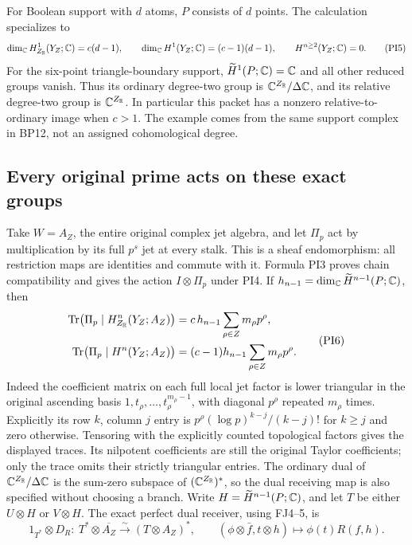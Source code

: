 For Boolean support with $d$ atoms, $P$ consists of $d$ points.
The calculation specializes to
\[
 \dim_\mathbb C H^1_{Z_\mathbb R}(Y_Z;\mathbb C)=c(d-1),\qquad
 \dim_\mathbb C H^1(Y_Z;\mathbb C)=(c-1)(d-1),
 \qquad H^{n\ge2}(Y_Z;\mathbb C)=0.
 \tag{PI5}\label{pi:boolean}
\]
For the six-point triangle-boundary support, $\widetilde H^1(P;\mathbb C)
=\mathbb C$ and all other reduced groups vanish. Thus its ordinary
degree-two group is $\mathbb C^{Z_\mathbb R}/\Delta\mathbb C$, and its relative
degree-two group is $\mathbb C^{Z_\mathbb R}$. In particular this packet
has a nonzero relative-to-ordinary image when $c>1$. The example
comes from the same support complex in BP12, not an assigned
cohomological degree.

\subsection{Every original prime acts on these exact groups}
Take $W=A_Z$, the entire original complex jet algebra, and let
$\Pi_p$ act by multiplication by its full $p^s$ jet at every
stalk. This is a sheaf endomorphism: all restriction maps are
identities and commute with it. Formula PI3 proves chain
compatibility and gives the action $I\otimes\Pi_p$ under PI4.
If $h_{n-1}=\dim_\mathbb C\widetilde H^{n-1}(P;\mathbb C)$, then
\[
 \begin{aligned}
 \operatorname{Tr}\bigl(\Pi_p\mid H^n_{Z_\mathbb R}(Y_Z;A_Z)\bigr)
 &=c\,h_{n-1}\sum_{\rho\in Z}m_\rho p^\rho,\\
 \operatorname{Tr}\bigl(\Pi_p\mid H^n(Y_Z;A_Z)\bigr)
 &=(c-1)h_{n-1}\sum_{\rho\in Z}m_\rho p^\rho.
 \end{aligned}
 \tag{PI6}\label{pi:traces}
\]
Indeed the coefficient matrix on each full local jet factor is
lower triangular in the original ascending basis
$1,t_\rho,\ldots,t_\rho^{m_\rho-1}$, with diagonal $p^\rho$
repeated $m_\rho$ times. Explicitly its row $k$, column $j$ entry is
$p^\rho(\log p)^{k-j}/(k-j)!$ for $k\ge j$ and zero otherwise.
Tensoring with the explicitly counted topological factors gives
the displayed traces. Its nilpotent coefficients are still the
original Taylor coefficients; only the trace omits their strictly
triangular entries. The ordinary dual of
$\mathbb C^{Z_\mathbb R}/\Delta\mathbb C$ is the sum-zero subspace of
$(\mathbb C^{Z_\mathbb R})^*$, so the dual receiving map is also specified
without choosing a branch. Write $H=\widetilde H^{n-1}(P;\mathbb C)$,
and let $T$ be either $U\otimes H$ or $V\otimes H$. The exact
perfect dual receiver, using FJ4--5, is
\[
 1_{T^*}\otimes D_R:\ T^*\otimes\overline{A_Z}
     \xrightarrow{\sim}(T\otimes A_Z)^*,\qquad
 (\phi\otimes\bar f,t\otimes h)\longmapsto\phi(t)R(f,h).
 \tag{PI8}\label{pi:dual-receiver}
\]
